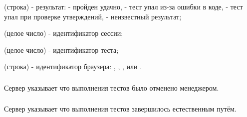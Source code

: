 \begin{icItems}
	\item {} (строка) - результат:  - пройден удачно,  - тест упал из-за ошибки в коде,  - тест упал при проверке утверждений,  - неизвестный результат;
	\item {} (целое число) - идентификатор сессии;
	\item {} (целое число) - идентификатор теста;
	\item {} (строка) - идентификатор браузера: , , ,  или .
\end{icItems}

\subsubsection{}

Сервер указывает что выполнения тестов было отменено менеджером.

\subsubsection{}

Сервер указывает что выполнения тестов завершилось естественным путём.